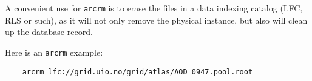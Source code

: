 \begin{framed}
   A convenient use for \texttt{arcrm} is to erase the files in a data
   indexing catalog (LFC, RLS or such), as it will not only remove the
   physical instance, but also will clean up the database record.
\end{framed}

Here is an \texttt{arcrm} example:

\begin{verbatim}
    arcrm lfc://grid.uio.no/grid/atlas/AOD_0947.pool.root
\end{verbatim}

% 
% 


